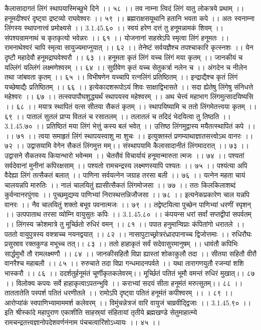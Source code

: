 कैलासादागतं लिंगं स्थापयास्मिच्छुभे दिने ।। ५८ ।।
तव नाम्ना त्विदं लिंगं यातु लोकत्रये प्रथाम् ।।
हनूमदीश्वरं दृष्ट्वा द्रष्टव्यो राघवेश्वरः ।। ५९ ।।
ब्रह्मराक्षसयूथानि हतानि भवता कपे ।।
अतः स्वनाम्ना लिंगस्य स्थापनात्त्वं प्रमोक्ष्यसे ।। 3.1.45.६० ।।
स्वयं हरेण दत्तं तु हनूमन्नामकं शिवम् ।।
संपश्यन्रामनाथं च कृतकृत्यो भवेन्नरः ।। ६१ ।।
योजनानां सहस्रेऽपि स्मृत्वा लिंगं हनूमतः ।।
रामनाथेश्वरं चापि स्मृत्वा सायुज्यमाप्नुयात् ।। ६२ ।।
तेनेष्टं सर्वयज्ञैश्च तपश्चाकारि कृत्स्नशः ।।
येन दृष्टौ महादेवौ हनूमद्राघवेश्वरौ ।। ६३ ।।
हनूमता कृतं लिंगं यच्च लिंगं मया कृतम् ।।
जानकीयं च यल्लिंगं यल्लिंगं लक्ष्मणेश्वरम् ।। ६४ ।।
सुग्रीवेण कृतं यच्च सेतुकर्त्रा नलेन च ।।
अंगदेन च नीलेन तथा जांबवता कृतम् ।। ६५ ।।
विभीषणेन यच्चापि रत्नलिंगं प्रतिष्ठितम् ।।
इन्द्राद्यैश्च कृतं लिंगं यच्छेषाद्यैः प्रतिष्ठितम् ।। ६६ ।।
इत्येकादशरूपोऽयं शिवः साक्षाद्विभासते ।।
सदा ह्येतेषु लिंगेषु संनिधत्ते महेश्वरः ।। ६७ ।।
तत्स्वपापौघशुद्ध्यर्थं स्थापयस्व महेश्वरम् ।।
अथ चेत्त्वं महाभाग लिंगमुत्सादयिष्यसि ।। ६८ ।।
मयात्र स्थापितं वत्स सीतया सैकतं कृतम् ।।
स्थापयिष्यामि च ततो लिंगमेतत्त्वया कृतम् ।। ६९ ।।
पातालं सुतलं प्राप्य वितलं च रसातलम् ।।
तलातलं च तदिदं भेदयित्वा तु तिष्ठति ।। 3.1.45.७० ।।
प्रतिष्ठितं मया लिंगं भेत्तुं कस्य बलं भवेत् ।।
उत्तिष्ठ लिंगमुद्वास्य मयैतत्स्थापितं कपे ।। ।। ७१ ।।
त्वया समाहृतं लिंगं स्थापयस्वाशु मा शुचः ।।
इत्युक्तस्तं प्रणम्याथाज्ञातसत्त्वोऽथ वानरः ।। ७२ ।।
उद्वासयामि वेगेन सैकतं लिंगमुत्त मम्।।
संस्थापयामि कैलासादानीतं लिंगमादरात् ।। ७३ ।।
उद्वासने सैकतस्य कियान्भारो भवेन्मम ।।
चेतसैवं विचार्यायं हनूमान्मारुता त्मजः ।। ७४ ।।
पश्यतां सर्वदेवानां मुनीनां कपिरक्षसाम् ।।
पश्यतो रामचन्द्रस्य लक्ष्मणस्यापि पश्यतः ।। ७५ ।।
पश्यंत्या अपि वैदेह्या लिंगं तत्सैकतं बलात् ।।
पाणिना सर्वयत्नेन जग्राह तरसा बली ।। ७६ ।।
यत्नेन महता चायं चालयन्नपि मारुतिः ।।
नालं चालयितुं ह्यासीत्सैकतं लिंगमोजसा ।। ७७ ।।
ततः किलकिलाशब्दं कुर्वन्वानरपुंगवः ।।
पुच्छमुद्यम्य पाणिभ्यां निरास्थत्तन्निजौजसा ।। ७८ ।।
इत्यनेकप्रकारेण चाल यन्नपि वानरः ।।
नैव चालयितुं शक्तो बभूव पवनात्मजः ।। ७९ ।।
तद्वेष्टयित्वा पुच्छेन पाणिभ्यां धरणीं स्पृशन् ।।
उत्पपाताथ तरसा व्योम्नि वायुसुतः कपिः ।। 3.1.45.८० ।।
कंपयन्स धरां सर्वां सप्तद्वीपां सपर्वतम् ।।
लिंगस्य क्रोशमात्रे तु मूर्च्छितो रुधिरं वमन् ।। ८१ ।।
पपात हनुमान्विप्राः कंपितांगो धरातले ।।
पततो वायुपुत्रस्य वक्त्राच्च नयनद्वयात् ।। ८२ ।।
नासापुटाच्छ्रोत्ररंध्रादपानाच्च द्विजोत्तमाः ।।
रुधिरौघः प्रसुस्राव रक्तकुण्ड मभूच्च तत्।। ८३ ।।
ततो हाहाकृतं सर्वं सदेवासुरमानुषम् ।।
धावंतौ कपिभिः सार्द्धमुभौ तौ रामलक्ष्मणौ ।। ८४ ।।
जानकीसहितौ विप्रा ह्यास्तां शोकाकुलौ तदा ।।
सीतया सहितौ वीरौ वानरैश्च महाबलौ ।। ८५ ।।
रुरुचाते तदा विप्रा गन्धमादनपर्वते ।।
यथा तारागणयुतौ रजन्यां शशि भास्करौ ।। ८६ ।।
ददर्शतुर्हनूमंतं चूर्णीकृतकलेवरम्।।
मूर्च्छितं पतितं भूमौ वमन्तं रुधिरं मुखात्।। ८७ ।।
विलोक्य कपयः सर्वे हाहाकृत्वाऽपतन्भुवि ।।
कराभ्यां सदयं सीता हनूमंतं मरुत्सुतम्।। ८८ ।।
ताततातेति पस्पर्श पतितं धरणीतले ।।
रामोऽपि दृष्ट्वा पतितं हनूमंतं कपीश्वरम् ।। । ८९ ।।
आरोप्यांकं स्वपाणिभ्यामाममर्श कलेवरम् ।।
विमुंचन्नेत्रजं वारि वायुजं चाव्रवीद्द्विजाः ।। 3.1.45.९० ।।
इति श्रीस्कांदे महापुराण एकाशीति साहस्र्यां संहितायां तृतीये ब्रह्मखण्डे सेतुमाहात्म्ये रामचन्द्रतत्त्वज्ञानोपदेशवर्णनंनाम पंचचत्वारिंशोऽध्यायः ।। ४५ ।।


